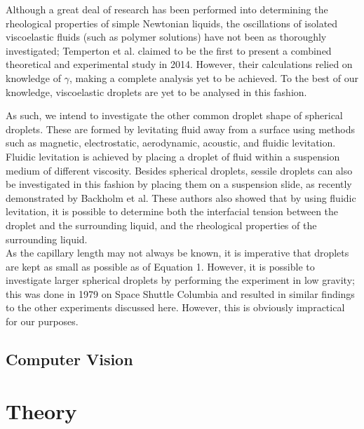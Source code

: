 \documentclass{physics_article_B}
\begin{document}
Although a great deal of research has been performed into determining the rheological properties of simple Newtonian liquids, the oscillations of isolated viscoelastic fluids (such as polymer solutions) have not been as thoroughly investigated; Temperton et al. claimed to be the first to present a combined theoretical and experimental study in 2014\cite{temperton2014mechanical}. However, their calculations relied on knowledge of $\gamma$, making a complete analysis yet to be achieved. To the best of our knowledge, viscoelastic droplets are yet to be analysed in this fashion.

As such, we intend to investigate the other common droplet shape of spherical droplets. These are formed by levitating fluid away from a surface using methods such as magnetic\cite{temperton2014mechanical, levitate2}, electrostatic\cite{mugele2006microfluidic, wong1981dynamics}, aerodynamic\cite{benmore2017aerodynamic}, acoustic\cite{thesis, yarin1998acoustic}, and fluidic levitation. Fluidic levitation is achieved by placing a droplet of fluid within a suspension medium of different viscosity. Besides spherical droplets, sessile droplets can also be investigated in this fashion by placing them on a suspension slide, as recently demonstrated by Backholm et al\cite{backholm2017oscillating}. These authors also showed that\cite{backholm2017oscillating} by using fluidic levitation, it is possible to determine both the interfacial tension between the droplet and the surrounding liquid, and the rheological properties of the surrounding liquid.\\

As the capillary length may not always be known, it is imperative that droplets are kept as small as possible as of Equation 1. However, it is possible to investigate larger spherical droplets by performing the experiment in low gravity; this was done in 1979\cite{holt1997surface} on Space Shuttle Columbia and resulted in similar findings to the other experiments discussed here. However, this is obviously impractical for our purposes.\\

\subsection{Computer Vision}

\section{Theory\label{sect:theory}}
\end{document}
